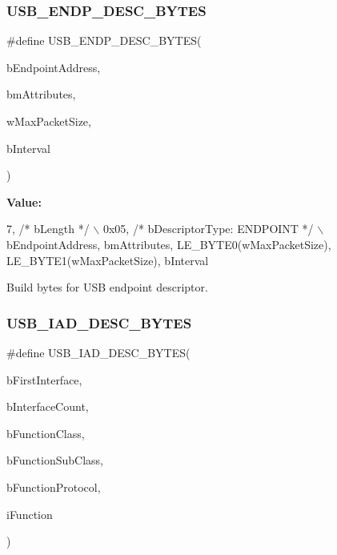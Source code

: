 \subsubsection{\texorpdfstring{U\+S\+B\+\_\+\+E\+N\+D\+P\+\_\+\+D\+E\+S\+C\+\_\+\+B\+Y\+T\+ES}{USB\_ENDP\_DESC\_BYTES}}
{\footnotesize\ttfamily \#define U\+S\+B\+\_\+\+E\+N\+D\+P\+\_\+\+D\+E\+S\+C\+\_\+\+B\+Y\+T\+ES(\begin{DoxyParamCaption}\item[{}]{b\+Endpoint\+Address,  }\item[{}]{bm\+Attributes,  }\item[{}]{w\+Max\+Packet\+Size,  }\item[{}]{b\+Interval }\end{DoxyParamCaption})}

{\bfseries Value\+:}
\begin{DoxyCode}
7,        \textcolor{comment}{/* bLength */}                                                                                    
              \(\backslash\)
        0x05, \textcolor{comment}{/* bDescriptorType: ENDPOINT */}                                                              
                  \(\backslash\)
        bEndpointAddress, bmAttributes, LE\_BYTE0(wMaxPacketSize), LE\_BYTE1(wMaxPacketSize), bInterval
\end{DoxyCode}
Build bytes for U\+SB endpoint descriptor. \mbox{\label{group__usb__protocol__group_ga80815c81bf0cc49109676aaa0e79691e}} 
\subsubsection{\texorpdfstring{U\+S\+B\+\_\+\+I\+A\+D\+\_\+\+D\+E\+S\+C\+\_\+\+B\+Y\+T\+ES}{USB\_IAD\_DESC\_BYTES}}
{\footnotesize\ttfamily \#define U\+S\+B\+\_\+\+I\+A\+D\+\_\+\+D\+E\+S\+C\+\_\+\+B\+Y\+T\+ES(\begin{DoxyParamCaption}\item[{}]{b\+First\+Interface,  }\item[{}]{b\+Interface\+Count,  }\item[{}]{b\+Function\+Class,  }\item[{}]{b\+Function\+Sub\+Class,  }\item[{}]{b\+Function\+Protocol,  }\item[{}]{i\+Function }\end{DoxyParamCaption})}


